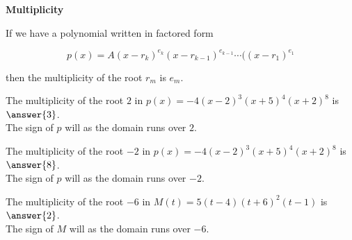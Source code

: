 \documentclass{ximera}
\author{Lee Wayand}
\begin{document}
\begin{exercise}






\begin{idea} \textbf{\textcolor{blue!55!black}{Multiplicity}}


If we have a polynomial written in factored form

\[
p(x) = A (x-r_k)^{e_k} (x-r_{k-1})^{e_{k-1}}  \cdots ((x-r_1)^{e_1}
\]

then the multiplicity of the root $r_m$ is $e_m$. \\





\end{idea}



\begin{question}


The multiplicity of the root $2$ in $p(x) = -4 (x - 2)^3 (x + 5)^4 (x + 2)^8$ is $\answer{3}$. \\



The sign of $p$ will  as the domain runs over $2$.

\end{question}





\begin{question}


The multiplicity of the root $-2$ in $p(x) = -4 (x - 2)^3 (x + 5)^4 (x + 2)^8$ is $\answer{8}$. \\



The sign of $p$ will  as the domain runs over $-2$.

\end{question}





\begin{question}


The multiplicity of the root $-6$ in $M(t) = 5(t - 4) (t + 6)^2 (t - 1)$ is $\answer{2}$. \\


The sign of $M$ will  as the domain runs over $-6$.




\end{question}
\end{exercise}
\end{document}
